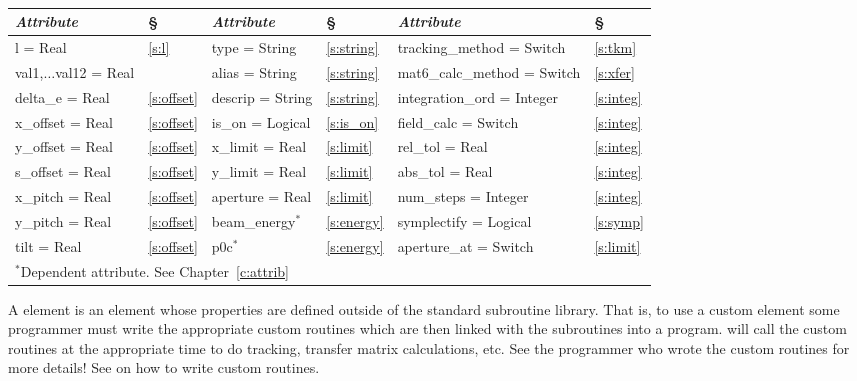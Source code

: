 \begin{center}
\tt
\begin{tabular}{|l|l||l|l||l|l|} \hline
  {\sl Attribute} & \S  & {\sl Attribute} & \S  & {\sl Attribute} & \S \\ \hline
  l        = Real           & \ref{s:l}      & type = String    & \ref{s:string} & tracking\_method = Switch   & \ref{s:tkm}   \\ \hline
  val1,$\ldots$val12 = Real &                & alias = String   & \ref{s:string} & mat6\_calc\_method = Switch & \ref{s:xfer}  \\ \hline
  delta\_e   = Real         & \ref{s:offset} & descrip = String & \ref{s:string} & integration\_ord = Integer  & \ref{s:integ} \\ \hline
  x\_offset  = Real         & \ref{s:offset} & is\_on = Logical & \ref{s:is_on}  & field\_calc = Switch        & \ref{s:integ} \\ \hline
  y\_offset  = Real         & \ref{s:offset} & x\_limit = Real  & \ref{s:limit}  & rel\_tol = Real             & \ref{s:integ} \\ \hline
  s\_offset  = Real         & \ref{s:offset} & y\_limit = Real  & \ref{s:limit}  & abs\_tol = Real             & \ref{s:integ} \\ \hline
  x\_pitch = Real           & \ref{s:offset} & aperture = Real  & \ref{s:limit}  & num\_steps = Integer        & \ref{s:integ} \\ \hline
  y\_pitch = Real           & \ref{s:offset} & beam\_energy$^*$ & \ref{s:energy} & symplectify = Logical       & \ref{s:symp}  \\ \hline
  tilt     = Real           & \ref{s:offset} & p0c$^*$          & \ref{s:energy} & aperture\_at = Switch       & \ref{s:limit} \\ \hline
  \multicolumn{6}{l}{\small $^*$Dependent attribute. See Chapter~\ref{c:attrib}} \\
\end{tabular}
\end{center}
\toffset

A  element is an element whose properties are defined
outside of the standard \bmad subroutine library. That is, to use a
custom element some programmer must write the appropriate custom
routines which are then linked with the \bmad subroutines into a
program. \bmad will call the custom routines at the appropriate time
to do tracking, transfer matrix calculations, etc. See the programmer
who wrote the custom routines for more details! See 
 on how to write custom routines.


